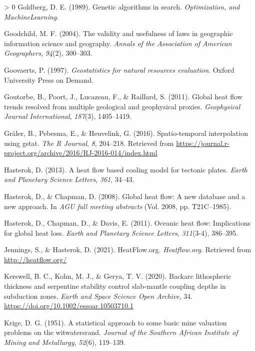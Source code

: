 \documentclass[draft,linenumbers]{agujournal2018}
\newlength{\cslhangindent}
\newenvironment{CSLReferences}[3] %
 {%
  \setlength{\parindent}{0pt}
  \ifodd #1 \everypar{\setlength{\hangindent}{\cslhangindent}}\ignorespaces\fi
  \ifnum #2 > 0
  \setlength{\parskip}{#2\baselineskip}
  \fi
 }%
 {}
\begin{document}
\begin{CSLReferences}{1}{0}
\leavevmode\hypertarget{ref-goldberg1989}{}%
Goldberg, D. E. (1989). Genetic algorithms in search.
\emph{Optimization, and MachineLearning}.

\leavevmode\hypertarget{ref-goodchild2004}{}%
Goodchild, M. F. (2004). The validity and usefulness of laws in
geographic information science and geography. \emph{Annals of the
Association of American Geographers}, \emph{94}(2), 300--303.

\leavevmode\hypertarget{ref-goovaerts1997}{}%
Goovaerts, P. (1997). \emph{Geostatistics for natural resources
evaluation}. Oxford University Press on Demand.

\leavevmode\hypertarget{ref-goutorbe2011}{}%
Goutorbe, B., Poort, J., Lucazeau, F., \& Raillard, S. (2011). Global
heat flow trends resolved from multiple geological and geophysical
proxies. \emph{Geophysical Journal International}, \emph{187}(3),
1405--1419.

\leavevmode\hypertarget{ref-graler2016}{}%
Gräler, B., Pebesma, E., \& Heuvelink, G. (2016). Spatio-temporal
interpolation using gstat. \emph{The R Journal}, \emph{8}, 204--218.
Retrieved from
\url{https://journal.r-project.org/archive/2016/RJ-2016-014/index.html}

\leavevmode\hypertarget{ref-hasterok2013}{}%
Hasterok, D. (2013). A heat flow based cooling model for tectonic
plates. \emph{Earth and Planetary Science Letters}, \emph{361}, 34--43.

\leavevmode\hypertarget{ref-hasterok2008}{}%
Hasterok, D., \& Chapman, D. (2008). Global heat flow: A new database
and a new approach. In \emph{AGU fall meeting abstracts} (Vol. 2008, pp.
T21C--1985).

\leavevmode\hypertarget{ref-hasterok2011}{}%
Hasterok, D., Chapman, D., \& Davis, E. (2011). Oceanic heat flow:
Implications for global heat loss. \emph{Earth and Planetary Science
Letters}, \emph{311}(3-4), 386--395.

\leavevmode\hypertarget{ref-jennings2021}{}%
Jennings, S., \& Hasterok, D. (2021). HeatFlow.org. \emph{Heatflow.org}.
Retrieved from \url{http://heatflow.org/}

\leavevmode\hypertarget{ref-kerswell2020}{}%
Kerswell, B. C., Kohn, M. J., \& Gerya, T. V. (2020). Backarc
lithospheric thickness and serpentine stability control slab-mantle
coupling depths in subduction zones. \emph{Earth and Space Science Open
Archive}, 34. \url{https://doi.org/10.1002/essoar.10503710.1}

\leavevmode\hypertarget{ref-krige1951}{}%
Krige, D. G. (1951). A statistical approach to some basic mine valuation
problems on the witwatersrand. \emph{Journal of the Southern African
Institute of Mining and Metallurgy}, \emph{52}(6), 119--139.


\end{CSLReferences}
\end{document}
